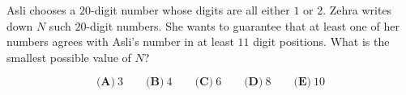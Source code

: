 Asli chooses a \(20\)-digit number whose digits are all either \(1\) or \(2\). Zehra writes down \(N\) such \(20\)-digit numbers. She wants to guarantee that at least one of her numbers agrees with Asli's number in at least \(11\) digit positions. What is the smallest possible value of \(N\)?



\[
\textbf{(A)}\ 3
\qquad
\textbf{(B)}\ 4
\qquad
\textbf{(C)}\ 6
\qquad
\textbf{(D)}\ 8
\qquad
\textbf{(E)}\ 10
\]

